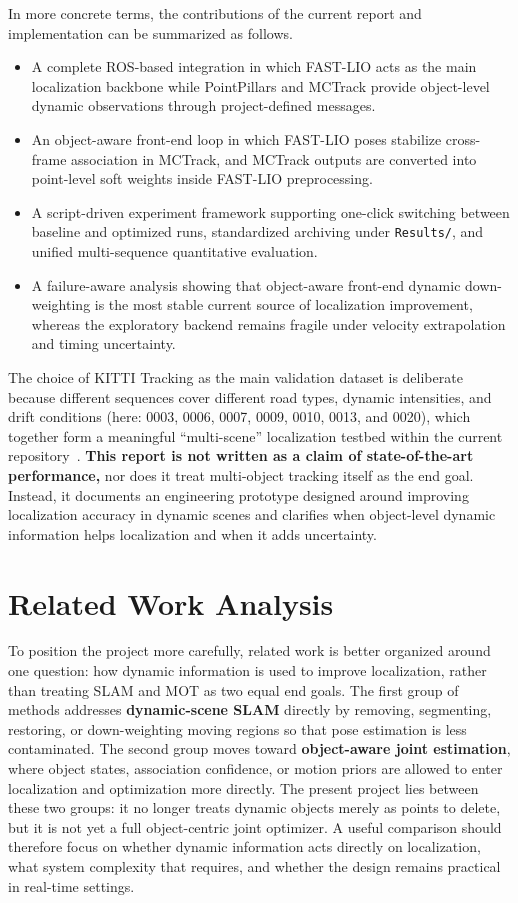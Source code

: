 \documentclass[a4paper,12pt]{article}
\begin{document}
In more concrete terms, the contributions of the current report and implementation can be summarized as follows.
\begin{itemize}[leftmargin=2em]
    \item A complete ROS-based integration in which FAST-LIO acts as the main localization backbone while PointPillars and MCTrack provide object-level dynamic observations through project-defined messages.
    \item An object-aware front-end loop in which FAST-LIO poses stabilize cross-frame association in MCTrack, and MCTrack outputs are converted into point-level soft weights inside FAST-LIO preprocessing.
    \item A script-driven experiment framework supporting one-click switching between baseline and optimized runs, standardized archiving under \texttt{Results/}, and unified multi-sequence quantitative evaluation.
    \item A failure-aware analysis showing that object-aware front-end dynamic down-weighting is the most stable current source of localization improvement, whereas the exploratory backend remains fragile under velocity extrapolation and timing uncertainty.
\end{itemize}

The choice of KITTI Tracking as the main validation dataset is deliberate because different sequences cover different road types, dynamic intensities, and drift conditions (here: 0003, 0006, 0007, 0009, 0010, 0013, and 0020), which together form a meaningful ``multi-scene'' localization testbed within the current repository~\cite{kitti}. \textbf{This report is not written as a claim of state-of-the-art performance,} nor does it treat multi-object tracking itself as the end goal. Instead, it documents an engineering prototype designed around improving localization accuracy in dynamic scenes and clarifies when object-level dynamic information helps localization and when it adds uncertainty.

\section{Related Work Analysis}
To position the project more carefully, related work is better organized around one question: how dynamic information is used to improve localization, rather than treating SLAM and MOT as two equal end goals. The first group of methods addresses \textbf{dynamic-scene SLAM} directly by removing, segmenting, restoring, or down-weighting moving regions so that pose estimation is less contaminated. The second group moves toward \textbf{object-aware joint estimation}, where object states, association confidence, or motion priors are allowed to enter localization and optimization more directly. The present project lies between these two groups: it no longer treats dynamic objects merely as points to delete, but it is not yet a full object-centric joint optimizer. A useful comparison should therefore focus on whether dynamic information acts directly on localization, what system complexity that requires, and whether the design remains practical in real-time settings.
\end{document}
